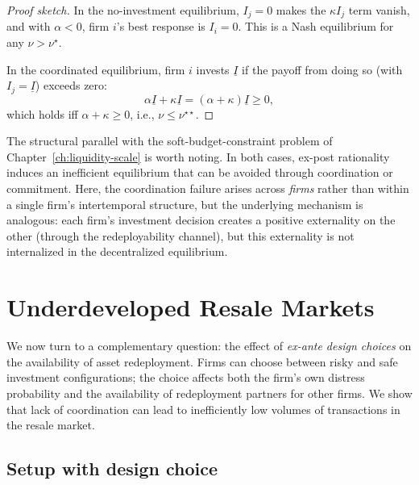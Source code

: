 \documentclass[11pt,a4paper,oneside]{book}
\def\leq{\leqslant}
\def\geq{\geqslant}
\theoremstyle{plain}
\theoremstyle{definition}
\theoremstyle{remark}
\numberwithin{equation}{chapter}
\begin{document}
\begin{proof}[Proof sketch]
In the no-investment equilibrium, $I_j = 0$ makes the $\kappa I_j$ term vanish, and with $\alpha < 0$, firm $i$'s best response is $I_i = 0$.
This is a Nash equilibrium for any $\nu > \nu^\star$.

In the coordinated equilibrium, firm $i$ invests $\underline{I}$ if the payoff from doing so (with $I_j = \underline{I}$) exceeds zero:
\begin{equation*}
  \alpha \underline{I} + \kappa \underline{I} = (\alpha + \kappa) \underline{I} \geq 0,
\end{equation*}
which holds iff $\alpha + \kappa \geq 0$, i.e., $\nu \leq \nu^{\star\star}$.
\end{proof}

The structural parallel with the soft-budget-constraint problem of Chapter~\ref{ch:liquidity-scale} is worth noting.
In both cases, ex-post rationality induces an inefficient equilibrium that can be avoided through coordination or commitment.
Here, the coordination failure arises across \emph{firms} rather than within a single firm's intertemporal structure, but the underlying mechanism is analogous: each firm's investment decision creates a positive externality on the other (through the redeployability channel), but this externality is not internalized in the decentralized equilibrium.

\section{Underdeveloped Resale Markets}
\label{sec:ma-resale}

We now turn to a complementary question: the effect of \emph{ex-ante design choices} on the availability of asset redeployment.
Firms can choose between risky and safe investment configurations; the choice affects both the firm's own distress probability and the availability of redeployment partners for other firms.
We show that lack of coordination can lead to inefficiently low volumes of transactions in the resale market.

\subsection{Setup with design choice}
\end{document}
